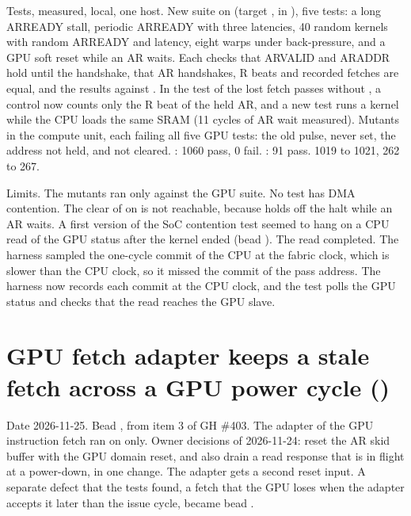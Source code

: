 \begin{record}

Tests, measured, local, one host. New suite  on  (target , in ), five tests: a long ARREADY stall, periodic ARREADY with three latencies, 40 random kernels with random ARREADY and latency, eight warps under back-pressure, and a GPU soft reset while an AR waits. Each checks that ARVALID and ARADDR hold until the handshake, that AR handshakes, R beats and recorded fetches are equal, and the results against . In  the test of the lost fetch passes without , a control now counts only the R beat of the held AR, and a new test runs a kernel while the CPU loads the same SRAM (11 cycles of AR wait measured). Mutants in the compute unit, each failing all five GPU tests: the old pulse,  never set, the address not held, and  not cleared. : 1060 pass, 0 fail. : 91 pass.  1019 to 1021,  262 to 267.

\end{record}

\begin{record}

Limits. The mutants ran only against the GPU suite. No test has DMA contention. The clear of  on  is not reachable, because  holds off the halt while an AR waits. A first version of the SoC contention test seemed to hang on a CPU read of the GPU status after the kernel ended (bead ). The read completed. The harness sampled the one-cycle commit of the CPU at the fabric clock, which is slower than the CPU clock, so it missed the commit of the pass address. The harness now records each commit at the CPU clock, and the test polls the GPU status and checks that the read reaches the GPU slave.

\end{record}

\section{GPU fetch adapter keeps a stale fetch across a GPU power cycle ()}\label{cr:defect:gif-stale-fetch}

\begin{record}

Date 2026-11-25. Bead , from item 3 of GH \#403. The adapter  of the GPU instruction fetch ran on  only. Owner decisions of 2026-11-24: reset the AR skid buffer with the GPU domain reset, and also drain a read response that is in flight at a power-down, in one change. The adapter gets a second reset input. A separate defect that the tests found, a fetch that the GPU loses when the adapter accepts it later than the issue cycle, became bead .

\end{record}

